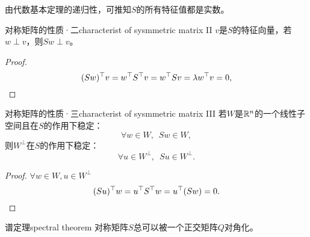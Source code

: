 由代数基本定理的递归性，可推知$S$的所有特征值都是实数。
\begin{theorem}{对称矩阵的性质·二}{characterist of sysmmetric matrix II}
	$v$是$S$的特征向量，若$w\perp v$，则$Sw\perp v$。
\end{theorem}
\begin{proof}
	
	\[
		(Sw)^\top v=w^\top S^\top v=w^\top Sv=\lambda w^\top v=0,
	\]
\end{proof}
\begin{theorem}{对称矩阵的性质·三}{characterist of sysmmetric matrix III}
	若$W$是$\mathbb R^n$的一个线性子空间且在$S$的作用下稳定：
	\[
		\forall w\in W,\enspace Sw\in W,
	\]
	则$W^\perp$在$S$的作用下稳定：
	\[
		\forall u\in W^\perp,\enspace Su\in W^\perp.
	\]
\end{theorem}
\begin{proof}
	$\forall w\in W,u\in W^\perp$
	\[
		(Su)^\top w=u^\top S^\top w=u^\top(Sw)=0.
	\]
\end{proof}
\begin{theorem}{谱定理}{spectral theorem}
	对称矩阵$S$总可以被一个正交矩阵$Q$对角化。
\end{theorem}

